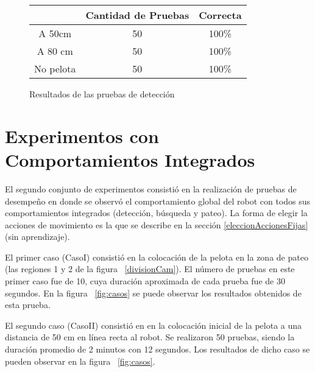 \begin{figure}
\centering
\begin{tabular}{|c|c|c|}
 \hline 
  & Cantidad de Pruebas & Correcta \\ 
 \hline 
 A 50cm & 50 & 100\% \\ 
 \hline 
 A 80 cm & 50 & 100\% \\ 
 \hline 
 No pelota & 50 & 100\% \\ 
  \hline 

 \end{tabular}  
\caption{Resultados de las pruebas de detecci\'on}
\label{fig:deteccion} 

\end{figure}

\section{Experimentos con Comportamientos Integrados}
\label{sec:experimentosintegrados}

El segundo conjunto de experimentos consistió en la realización de pruebas de desempeño en donde se observó el comportamiento global del robot con todos sus comportamientos integrados (detección, búsqueda y pateo). La forma de elegir la acciones de movimiento es la que se describe en la sección \ref{eleccionAccionesFijas} (sin aprendizaje). 

El  primer caso (CasoI) consistió en la colocación de la pelota en la zona de pateo (las regiones 1 y 2 de la figura ~\ref{divisionCam}). El número de pruebas en este primer caso fue de 10, cuya duración aproximada de cada prueba fue de 30 segundos. En la figura ~\ref{fig:casos} se puede observar los resultados obtenidos de esta prueba.


El segundo caso (CasoII) consistió en en la colocación inicial de la pelota a una distancia de 50 cm en línea recta al robot. Se realizaron 50 pruebas, siendo la duración promedio de 2 minutos con 12 segundos. Los resultados de dicho caso se pueden observar en la figura ~\ref{fig:casos}. 


